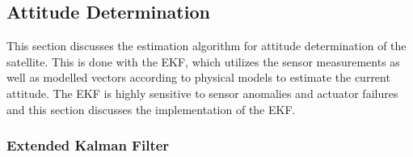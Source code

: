 %	
%
%	

\subsection{Attitude Determination}
This section discusses the estimation algorithm for attitude determination of the satellite. This is done with the EKF, which utilizes the sensor measurements as well as modelled vectors according to physical models to estimate the current attitude. The EKF is highly sensitive to sensor anomalies and actuator failures and this section discusses the implementation of the EKF.

\subsubsection{Extended Kalman Filter}

%
%


